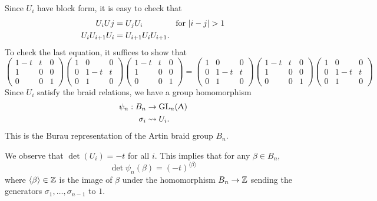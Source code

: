    Since $U_i$ have block form, it is easy to check that
\begin{align*}
  U_iUj &= U_jU_i \hspace*{4em}\text{for }|i-j| > 1 \\
  U_iU_{i+1}U_i &= U_{i+1}U_iU_{i+1}.
\end{align*}
To check the last equation, it suffices to show that 
\begin{displaymath}
\begin{pmatrix} 1-t & t & 0 \\ 1 & 0 & 0 \\ 0 & 0 & 1 \end{pmatrix}
  \begin{pmatrix} 1 & 0 & 0 \\ 0 & 1-t & t \\ 0 & 1 & 0 \end{pmatrix}
  \begin{pmatrix} 1-t & t & 0 \\ 1 & 0 & 0 \\ 0 & 0 & 1 \end{pmatrix} =
  \begin{pmatrix} 1 & 0 & 0 \\ 0 & 1-t & t \\ 0 & 1 & 0 \end{pmatrix}
  \begin{pmatrix} 1-t & t & 0 \\ 1 & 0 & 0 \\ 0 & 0 & 1 \end{pmatrix}
  \begin{pmatrix} 1 & 0 & 0 \\ 0 & 1-t & t \\ 0 & 1 & 0 \end{pmatrix}
\end{displaymath}
  Since $U_i$ satisfy the braid relations, we have a group homomorphism 
\begin{align*}
\label{eq:1}
  \psi_n : B_n &\to \text{GL}_n(\Uplambda) \\
  \sigma_i &\rightsquigarrow U_i.
\end{align*}
This is the Burau representation of the Artin braid group $B_n$.

We observe that $\det(U_i) = -t$ for all $i$. This implies that for any $\beta \in B_n$, 
\begin{displaymath}
\det \psi_n(\beta) = (-t)^{\langle \beta \rangle}
\end{displaymath}
where $\langle \beta \rangle \in \mathbb{Z}$ is the image of $\beta$ under the homomorphism $B_n \to \mathbb{Z}$ sending the generators $\sigma_1, \ldots, \sigma_{n-1}$ to $1$.

